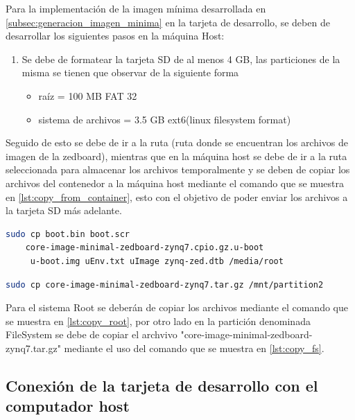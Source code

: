Para la implementación de la imagen mínima desarrollada en \ref{subsec:generacion_imagen_minima} en la tarjeta de desarrollo, se deben de desarrollar los siguientes pasos en la máquina Host:

\begin{enumerate}
    \item Se debe de formatear la tarjeta SD de al menos 4 GB, las particiones de la misma se tienen que observar de la siguiente forma 
    \begin{itemize}
        \item raíz = 100 MB FAT 32
        \item sistema de archivos = 3.5 GB ext6(linux filesystem format)
        \end{itemize} 
\end{enumerate}

Seguido de esto se debe de ir a la ruta (ruta donde se encuentran los archivos de imagen de la zedboard), mientras que en la máquina host se debe de ir a la ruta seleccionada para almacenar los archivos temporalmente y se deben de copiar los archivos del contenedor a la máquina host mediante el comando que se muestra en \ref{lst:copy_from_container}, esto con el objetivo de poder enviar los archivos a la tarjeta SD más adelante.

\begin{lstlisting}[language=bash, caption={Copiar archivos root, Linux}, label=lst:copy_root]
    sudo cp boot.bin boot.scr 
    core-image-minimal-zedboard-zynq7.cpio.gz.u-boot
     u-boot.img uEnv.txt uImage zynq-zed.dtb /media/root
\end{lstlisting}

\begin{lstlisting}[language=bash, caption={Copiar sistema de archivos, Linux}, label=lst:copy_fs]
    sudo cp core-image-minimal-zedboard-zynq7.tar.gz /mnt/partition2
\end{lstlisting}

Para el sistema Root se deberán de copiar los archivos mediante el comando que se muestra en \ref{lst:copy_root}, por otro lado en la partición denominada FileSystem se debe de copiar el archvivo "core-image-minimal-zedboard-zynq7.tar.gz" mediante el uso del comando que se muestra en \ref{lst:copy_fs}.

\subsection{Conexión de la tarjeta de desarrollo con el computador host}

